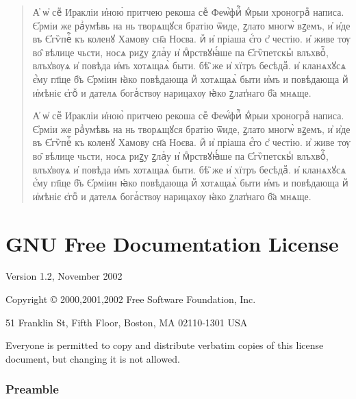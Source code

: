 \documentclass[12pt,a4paper,openany]{book}
\begin{document}
\begin{quote}
\large

А҆ ѡ҆ сеⷨ Иракліи и҆ною̀ притчею рекоша сеⷤ Феѡ҆́фиⷧ҇ мⷣрыи хронограⷴ написа.
Є҆рміи же раⷥумѣвь на нь творѧщꙋся братію ѿиде, ꙁлато многѡ̀ вꙁемъ, и҆ и҆де 
въ Є҆гѷпеⷮ҇ къ коленꙋ Хамову сн҃а Ноєва. иⷤ и҆ пріаша є҆́го с̾ честію. и҆ живе
тѹ во̑ вѣлице чьсти, носѧ риꙁу ꙁлаⷮу и҆ мⷣрствꙋꙗ҆́ше па Є҆гѷпетскыⷯ влъхвоⷯ҇,
влъх̾вѹѧ и҆ повѣда и҆мъ хотѧщаѧ̀ быти. бѣ̏ же и҆ хїтръ бесѣдаⷨ. и҆ кланѧхꙋсѧ
є҆́му гл҃ще б҃ъ Є҆рміин ꙗ҆ко повѣдающа иⷨ хотѧщаѧ̀ быти и҆мъ и повѣдающа 
иⷨ и҆мѣніє є҆гоⷤ и дателѧ богаⷮствѹ нарицахѹ ꙗ҆ко ꙁлат̾наго б҃а мнѧще.

\smallskip\itshape

А҆ ѡ҆ сеⷨ Иракліи и҆ною̀ притчею рекоша сеⷤ Феѡ҆́фиⷧ҇ мⷣрыи хронограⷴ написа.
Є҆рміи же раⷥумѣвь на нь творѧщꙋся братію ѿиде, ꙁла\-то многѡ̀ вꙁемъ, и҆ и҆де 
въ Є҆гѷпеⷮ҇ къ коленꙋ Хамову сн҃а Ноєва. иⷤ и҆ пріаша є҆́го с̾ честію. и҆ живе
тѹ во̑ вѣлице чьсти, носѧ риꙁу ꙁлаⷮу и҆ мⷣрствꙋꙗ҆́ше па Є҆гѷпетскыⷯ влъхвоⷯ҇,
влъх̾вѹѧ и҆ повѣда и҆мъ хотѧщаѧ̀ быти. бѣ̏ же и҆ хїтръ бесѣдаⷨ. и҆ кланѧхꙋсѧ
є҆́му гл҃ще б҃ъ Є҆рміин ꙗ҆ко повѣдающа иⷨ хотѧщаѧ̀ быти и҆мъ и повѣдающа 
иⷨ и҆мѣніє є҆гоⷤ и дателѧ богаⷮствѹ нарицахѹ ꙗ҆ко ꙁлат̾наго б҃а мнѧще.

\end{quote}

\chapter{GNU Free Documentation License}
\label{FDL}

\begin{center}

Version 1.2, November 2002

Copyright \copyright{} 2000,2001,2002  Free Software Foundation, Inc.
 
\bigskip
 
51 Franklin St, Fifth Floor, Boston, MA  02110-1301  USA
  
\bigskip
 
Everyone is permitted to copy and distribute verbatim copies of this
license document, but changing it is not allowed.

\end{center}

\subsection*{Preamble}
\end{document}
